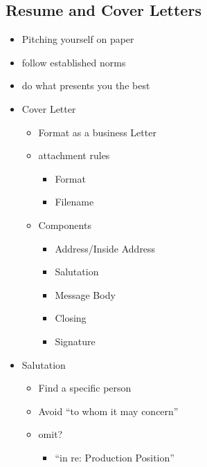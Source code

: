 \documentclass[12pt]{article}
\begin{document}
        \subsection{Resume and Cover Letters}
            \begin{itemize}
                \item Pitching yourself on paper
                \item follow established norms
                \item do what presents you the best
                \item Cover Letter
                \begin{itemize}
                    \item Format as a business Letter
                    \item attachment rules
                    \begin{itemize}
                        \item Format
                        \item Filename
                    \end{itemize}
                    \item Components
                    \begin{itemize}
                        \item Address/Inside Address
                        \item Salutation
                        \item Message Body
                        \item Closing
                        \item Signature
                    \end{itemize}
                \end{itemize}
                \item Salutation
                \begin{itemize}
                    \item Find a specific person
                    \item Avoid ``to whom it may concern''
                    \item omit?
                    \begin{itemize}
                        \item ``in re: Production Position''
                    \end{itemize}
                \end{itemize}

\end{itemize}
\end{document}
